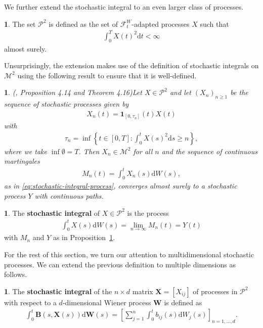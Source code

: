\documentclass[english]{article}
\numberwithin{equation}{section}
\numberwithin{figure}{section}
\theoremstyle{bolddescit}
\theoremstyle{definition}
\newtheorem{definition}[theorem]{\protect\definitionname}
\theoremstyle{definition}
\theoremstyle{plain}
\theoremstyle{plain}
\theoremstyle{bolddesc}
\theoremstyle{plain}
\newtheorem{proposition}[theorem]{\protect\propositionname}
\theoremstyle{remark}
\providecommand{\definitionname}{Definition}
\providecommand{\propositionname}{Proposition}
\begin{document}
We further extend the stochastic integral to an even larger class of processes.

\begin{definition}
  The set $\mathcal{P}^2$ is defined as the set of $\mathcal{F}^W_t$-adapted processes $X$ such that
  \begin{align*}
    \int_0^T X(t)^2 \mathrm{d}t < \infty
  \end{align*}
  almost surely.
\end{definition}

Unsurprisingly, the extension makes use of the definition of stochastic integrals on $\mathcal{M}^2$ using the following result to ensure that it is well-defined.

\begin{proposition}(\cite{capinski_stochastic_2012}, Proposition 4.14 and Theorem 4.16)\label{prop:p2-localising-sequence}
  Let $X \in \mathcal{P}^2$ and let $(X_n)_{n \ge 1}$ be the sequence of stochastic processes given by
  \begin{align*}
    X_n(t) = \mathbf{1}_{[0,\tau_n]}(t) X(t)
  \end{align*}
  with
  \begin{align*}
    \tau_n = \inf \left\{ t \in [0,T] : \int_0^t X(s)^2 \mathrm{d}s \ge n \right\},
  \end{align*}
  where we take $\inf \emptyset = T$.
  Then $X_n \in \mathcal{M}^2$ for all $n$ and the sequence of continuous martingales
  \begin{align*}
    M_n(t) = \int_0^t X_n(s) \mathrm{d}W(s),
  \end{align*}
  as in \eqref{eq:stochastic-integral-process}, converges almost surely to a stochastic process $Y$ with continuous paths.
\end{proposition}

\begin{definition}
  The \textbf{stochastic integral} of $X \in \mathcal{P}^2$ is the process
  \begin{align*}
    \int_0^t X(s) \mathrm{d}W(s) = \lim_{n \to \infty} M_n(t) = Y(t)
  \end{align*}
  with $M_n$ and $Y$ as in Proposition~\ref{prop:p2-localising-sequence}.
\end{definition}

For the rest of this section, we turn our attention to multidimensional stochastic processes. We can extend the previous definition to multiple dimensions as follows.

\begin{definition}
  The \textbf{stochastic integral} of the $n \times d$ matrix $\mathbf{X} = [X_{ij}]$ of processes in $\mathcal{P}^2$ with respect to a $d$-dimensional Wiener process $\mathbf{W}$ is defined as
  \begin{align*}
    \int_0^t \mathbf{B}(s,\mathbf{X}(s)) \mathrm{d}\mathbf{W}(s) = \left[
      \sum_{j=1}^{n} \int_0^t b_{ij}(s) \mathrm{d}W_j(s)
    \right]_{n=1,\ldots,d}.
  \end{align*}
\end{definition}
\end{document}
